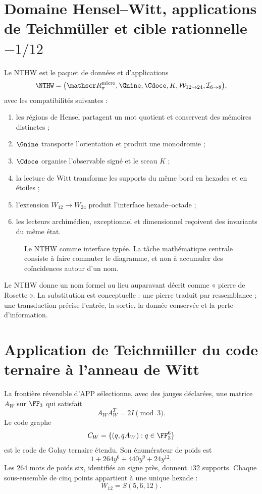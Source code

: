 \label{chap:p3-83-27-menos_un_doceavo}

\section{Domaine Hensel--Witt, applications de Teichmüller et cible rationnelle \(-1/12\)}

Le NTHW est le paquet de données et d’applications
\[
\NTHW=
\bigl(
\mathscr R_\pi^{\rm micro},
\Gnine,
\Cdoce,
K,
\mathcal W_{12\to24},
\mathcal I_{6\to8}
\bigr),
\]
avec les compatibilités suivantes :
\begin{enumerate}
  \item les régions de Hensel partagent un mot quotient et conservent
  des mémoires distinctes ;
  \item \(\Gnine\) transporte l’orientation et produit une monodromie ;
  \item \(\Cdoce\) organise l’observable signé et le sceau \(K\) ;
  \item la lecture de Witt transforme les supports du même bord en hexades et en
  étoiles ;
  \item l’extension \(W_{12}\to W_{24}\) produit l’interface
  hexade--octade ;
  \item les lecteurs archimédien, exceptionnel et dimensionnel reçoivent
  des invariants du même état.
\end{enumerate}

\begin{figure}[!htbp]
\centering
\resizebox{\textwidth}{!}{}
\caption{Le NTHW comme interface typée. La tâche mathématique centrale consiste à faire
commuter le diagramme, et non à accumuler des coïncidences autour d’un nom.}
\label{p3-83-c27-s1:fig:nthw}
\end{figure}

Le NTHW donne un nom formel au lieu auparavant décrit comme « pierre de
Rosette ». La substitution est conceptuelle : une pierre traduit par ressemblance ; une
transduction précise l’entrée, la sortie, la donnée conservée et la perte
d’information.

\section{Application de Teichmüller du code ternaire à l’anneau de Witt}

La frontière réversible d’APP sélectionne, avec des jauges déclarées, une matrice
\(A_W\) sur \(\FF_3\) qui satisfait
\[
A_WA_W^T=2I\pmod3.
\]
Le code graphe
\[
C_W=\{(q,qA_W):q\in\FF_3^6\}
\]
est le code de Golay ternaire étendu. Son énumérateur de poids est
\[
1+264y^6+440y^9+24y^{12}.
\]
Les \(264\) mots de poids six, identifiés au signe près, donnent \(132\)
supports. Chaque sous-ensemble de cinq points appartient à une unique hexade :
\[
W_{12}=S(5,6,12).
\]

